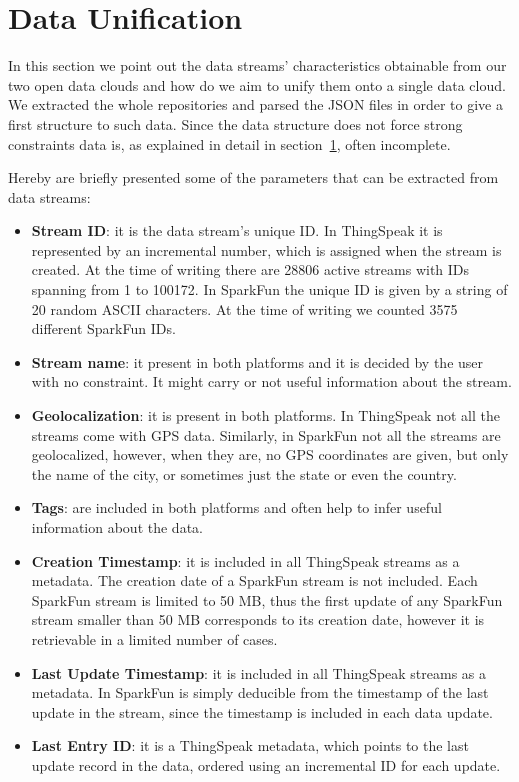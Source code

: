 \section{Data Unification}
\label{sec:unification}
In this section we point out the data streams' characteristics obtainable from our two open data clouds and how do we aim to unify them onto a single data cloud.
We extracted the whole repositories and parsed the JSON files in order to give a first structure to such data.
Since the data structure does not force strong constraints data is, as explained in detail in section~\ref{sec:unification}, often incomplete.

Hereby are briefly presented some of the parameters that can be extracted from data streams:
\begin{itemize}
 \item \textbf{Stream ID}: it is the data stream's unique ID. In ThingSpeak it is represented by an incremental number, which is assigned when the stream is created. At the time of writing there are 28806 active streams with IDs spanning from 1 to 100172. In SparkFun the unique ID is given by a string of 20 random ASCII characters. At the time of writing we counted 3575 different SparkFun IDs. 
 \item \textbf{Stream name}: it present in both platforms and it is decided by the user with no constraint. It might carry or not useful information about the stream.
 \item \textbf{Geolocalization}: it is present in both platforms. In ThingSpeak not all the streams come with GPS data. Similarly, in SparkFun not all the streams are geolocalized, however, when they are, no GPS coordinates are given, but only the name of the city, or sometimes just the state or even the country.
 \item \textbf{Tags}: are included in both platforms and often help to infer useful information about the data.
 \item \textbf{Creation Timestamp}: it is included in all ThingSpeak streams as a metadata. The creation date of a SparkFun stream is not included. Each SparkFun stream is limited to 50 MB, thus the first update of any SparkFun stream smaller than 50 MB corresponds to its creation date,  however it is retrievable in a limited number of cases.
 \item \textbf{Last Update Timestamp}: it is included in all ThingSpeak streams as a metadata. In SparkFun is simply deducible from the timestamp of the last update in the stream, since the timestamp is included in each data update.
 \item \textbf{Last Entry ID}: it is a ThingSpeak metadata, which points to the last update record in the data, ordered using an incremental ID for each update.
\end{itemize}

